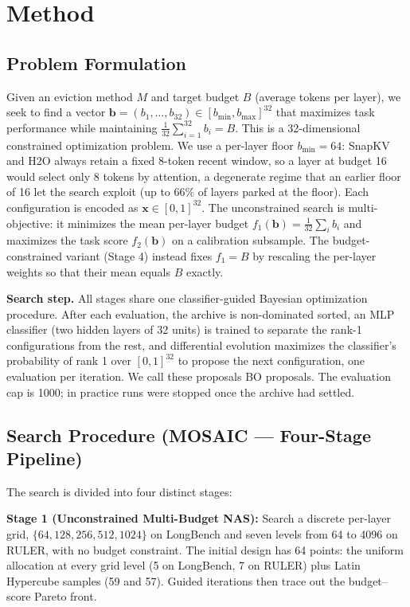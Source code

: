 \documentclass[11pt]{article}
\begin{document}
\section{Method}

\subsection{Problem Formulation}

Given an eviction method $M$ and target budget $B$ (average tokens per layer), we seek to find a vector $\mathbf{b} = (b_1, \ldots, b_{32}) \in [b_{\min}, b_{\max}]^{32}$ that maximizes task performance while maintaining $\frac{1}{32}\sum_{i=1}^{32} b_i = B$. This is a 32-dimensional constrained optimization problem. We use a per-layer floor $b_{\min} = 64$: SnapKV and H2O always retain a fixed 8-token recent window, so a layer at budget 16 would select only 8 tokens by attention, a degenerate regime that an earlier floor of 16 let the search exploit (up to 66\% of layers parked at the floor). Each configuration is encoded as $\mathbf{x} \in [0,1]^{32}$. The unconstrained search is multi-objective: it minimizes the mean per-layer budget $f_1(\mathbf{b}) = \frac{1}{32}\sum_i b_i$ and maximizes the task score $f_2(\mathbf{b})$ on a calibration subsample. The budget-constrained variant (Stage 4) instead fixes $f_1 = B$ by rescaling the per-layer weights so that their mean equals $B$ exactly.

\textbf{Search step.} All stages share one classifier-guided Bayesian optimization procedure. After each evaluation, the archive is non-dominated sorted, an MLP classifier (two hidden layers of 32 units) is trained to separate the rank-1 configurations from the rest, and differential evolution maximizes the classifier's probability of rank 1 over $[0,1]^{32}$ to propose the next configuration, one evaluation per iteration. We call these proposals BO proposals. The evaluation cap is 1000; in practice runs were stopped once the archive had settled.

\subsection{Search Procedure (MOSAIC — Four-Stage Pipeline)}

The search is divided into four distinct stages:

\textbf{Stage 1 (Unconstrained Multi-Budget NAS):} Search a discrete per-layer grid, $\{64,128,256,512,1024\}$ on LongBench and seven levels from 64 to 4096 on RULER, with no budget constraint. The initial design has 64 points: the uniform allocation at every grid level (5 on LongBench, 7 on RULER) plus Latin Hypercube samples (59 and 57). Guided iterations then trace out the budget--score Pareto front.
\end{document}
